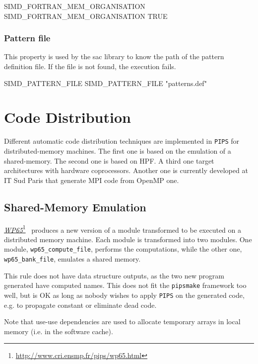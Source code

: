 \documentclass[a4paper]{report}
\newcommand{\LINK}[2]{\href{#2}{#1}\footnote{\url{#2}}\xspace}
\newcommand{\Pips}{\texttt{PIPS}}
\newcommand{\Pipsmake}{\texttt{pipsmake}}
\newcommand{\WPsc}{\LINK{\emph{WP65}}{http://www.cri.ensmp.fr/pips/wp65.html}}
\begin{document}
\begin{PipsProp}{SIMD_FORTRAN_MEM_ORGANISATION}
SIMD_FORTRAN_MEM_ORGANISATION TRUE
\end{PipsProp}

\subsubsection{Pattern file}

This property is used by the sac library to know the path of the pattern definition file.
If the file is not found, the execution fails.

\begin{PipsProp}{SIMD_PATTERN_FILE}
SIMD_PATTERN_FILE "patterns.def"
\end{PipsProp}


\section{Code Distribution}
\label{subsection-code-distribution}

Different automatic code distribution techniques are implemented in \Pips{} for
distributed-memory machines. The first one is based on the emulation of
a shared-memory. The second one is based on HPF. A third one target
architectures with hardware coprocessors. Another one is currently
developed at IT Sud Paris that generate MPI code from OpenMP one.

\subsection{Shared-Memory Emulation}
\label{subsubsection-shared-memory-emulation}

\WPsc{}~\cite{IA91,IA92a,IA92b} produces a new version of a module
transformed to be executed on a distributed memory machine. Each module
is transformed into two modules. One module, \texttt{wp65\_compute\_file},
performs the computations, while the other one, \texttt{wp65\_bank\_file},
emulates a shared memory.

This rule does not have data structure outputs, as the two new program
generated have computed names. This does not fit the \Pipsmake{} framework
too well, but is OK as long as nobody wishes to apply \Pips{} on the
generated code, e.g. to propagate constant or eliminate dead code.

Note that use-use dependencies are used to allocate temporary arrays in
local memory (i.e. in the software cache).
\end{document}
